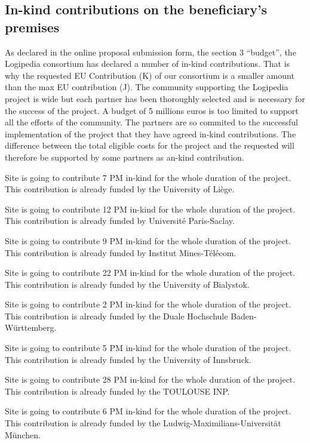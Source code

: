 \subsection*{In-kind contributions on the beneficiary’s premises}

As declared in the online proposal submission form, the section 3
``budget'', the Logipedia consortium has declared a number of in-kind
contributions. That is why the requested EU Contribution (K) of our
consortium is a smaller amount than the max EU contribution (J). The
community supporting the Logipedia project is wide but each partner
has been thoroughly selected and is necessary for the success of the
project.
A budget of 5 millions euros is too limited to support all
the efforts of the community.
The partners are so commited to the successful implementation of the
project that they have agreed in-kind contributions.
The difference between the total
eligible costs for the project and the requested will therefore be
supported by some partners as an-kind contribution.


Site  is going to contribute 7 PM in-kind for the whole duration of the project.
This contribution is already funded by the University of Liège.

Site  is going to contribute 12 PM in-kind for the whole duration of the project.
This contribution is already funded by Université Paris-Saclay.

Site  is going to contribute 9 PM in-kind for the whole duration of the project.
This contribution is already funded by Institut Mines-Télécom.

Site  is going to contribute 22 PM in-kind for the whole duration of the project.
This contribution is already funded by the University of Bialystok.

Site  is going to contribute 2 PM in-kind for the whole duration of the project.
This contribution is already funded by the Duale Hochschule Baden-Württemberg.

Site  is going to contribute 5 PM in-kind for the whole duration of the project.
This contribution is already funded by the University of Innsbruck.

Site  is going to contribute 28 PM in-kind for the whole duration of the project.
This contribution is already funded by the TOULOUSE INP.

Site  is going to contribute 6 PM in-kind for the whole duration of the project.
This contribution is already funded by the Ludwig-Maximilians-Universit\"at M\"unchen.

